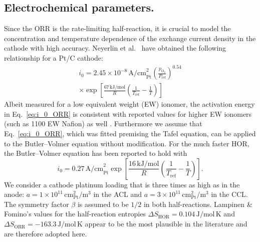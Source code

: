 \documentclass[fontsize=9pt,DIV=calc,a4paper,twocolumn]{scrartcl}
\begin{document}
\subsection*{Electrochemical parameters.}

Since the ORR is the rate-limiting half-reaction, it is crucial to model the concentration and temperature dependence of the exchange current density in the cathode with high accuracy. Neyerlin et al.~\cite{neyerlin:06} have obtained the following relationship for a Pt/C cathode:
%
\begin{multline}
\label{eq:i_0_ORR}
i_0 = 2.45\!\times\!10^{-8}\,\mathrm{A/cm}_\mathrm{Pt}^2\left(\frac{p_{\mathrm{O}_2}}{P_\mathrm{ref}}\right)^{0.54}\\
\times\exp\left[\frac{67\,\mathrm{kJ/mol}}{R}\left(\frac{1}{T_\mathrm{ref}}-\frac{1}{T}\right)\right]
\end{multline}
%
Albeit measured for a low equivalent weight (EW) ionomer, the activation energy in Eq.~\ref{eq:i_0_ORR} is consistent with reported values for higher EW ionomers (such as 1100 EW Nafion) as well \cite{neyerlin:06}. Furthermore we assume that Eq.~\ref{eq:i_0_ORR}, which was fitted premising the Tafel equation, can be applied to the Butler--Volmer equation without modification. For the much faster HOR, the Butler--Volmer equation has been reported to hold with \cite{neyerlin:07,durst:15}
%
\begin{equation}
i_0 = 0.27\,\mathrm{A/cm}_\mathrm{Pt}^2\exp\left[\frac{16\,\mathrm{kJ/mol}}{R}\left(\frac{1}{T_\mathrm{ref}}-\frac{1}{T}\right)\right].
\end{equation}
%
We consider a cathode platinum loading that is three times as high as in the anode: $a=1\!\times\!10^{11}\,\mathrm{cm}_\mathrm{Pt}^2/\mathrm{m}^3$ in the ACL and $a=3\!\times\!10^{11}\,\mathrm{cm}_\mathrm{Pt}^2/\mathrm{m}^3$ in the CCL. The symmetry factor $\beta$ is assumed to be $1/2$ in both half-reactions. Lampinen \& Fomino's values for the half-reaction entropies $\Delta S_\mathrm{HOR} = 0.104\,\mathrm{J/mol\,K}$ and $\Delta S_\mathrm{ORR} = -163.3\,\mathrm{J/mol\,K}$ \cite{lampinen:93} appear to be the most plausible in the literature and are therefore adopted here.
\end{document}
